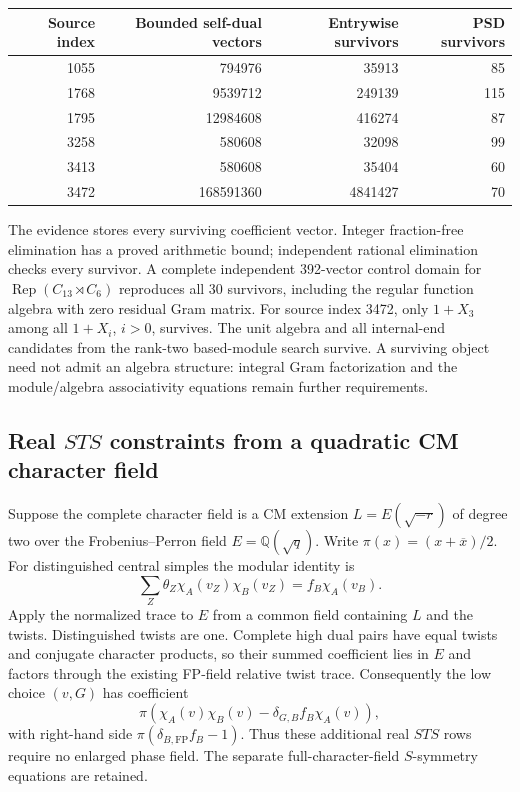 \begin{center}
\begin{tabular}{r|r|r|r}
Source index & Bounded self-dual vectors & Entrywise survivors & PSD survivors\\\hline
1055 & 794976 & 35913 & 85\\
1768 & 9539712 & 249139 & 115\\
1795 & 12984608 & 416274 & 87\\
3258 & 580608 & 32098 & 99\\
3413 & 580608 & 35404 & 60\\
3472 & 168591360 & 4841427 & 70
\end{tabular}
\end{center}

The evidence stores every surviving coefficient vector. Integer
fraction-free elimination has a proved arithmetic bound; independent
rational elimination checks every survivor. A complete independent
392-vector control domain for
$\operatorname{Rep}(C_{13}\rtimes C_6)$ reproduces all 30 survivors,
including the regular function algebra with zero residual Gram matrix.
For source index 3472, only $1+X_3$ among all $1+X_i$, $i>0$, survives.
The unit algebra and all internal-end candidates from the rank-two
based-module search survive. A surviving object need not admit an algebra
structure: integral Gram factorization and the module/algebra
associativity equations remain further requirements.

\subsection{Real $STS$ constraints from a quadratic CM character field}
Suppose the complete character field is a CM extension
$L=E(\sqrt{-r})$ of degree two over the Frobenius--Perron field
$E=\mathbb Q(\sqrt q)$. Write $\pi(x)=(x+\overline{x})/2$.
For distinguished central simples the modular identity is
\[
 \sum_Z\theta_Z\chi_A(v_Z)\chi_B(v_Z)
   =f_B\chi_A(v_B).
\]
Apply the normalized trace to $E$ from a common field containing $L$
and the twists. Distinguished twists are one. Complete high dual pairs
have equal twists and conjugate character products, so their summed
coefficient lies in $E$ and factors through the existing FP-field
relative twist trace. Consequently the low choice $(v,G)$ has coefficient
\[
 \pi\!\left(\chi_A(v)\chi_B(v)
       -\delta_{G,B}f_B\chi_A(v)\right),
\]
with right-hand side $\pi(\delta_{B,\mathrm{FP}}f_B-1)$.
Thus these additional real $STS$ rows require no enlarged phase field.
The separate full-character-field $S$-symmetry equations are retained.


